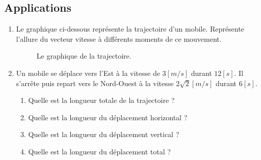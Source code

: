 \newpage

\subsection{Applications}
\begin{enumerate}
    \item Le graphique ci-dessous représente la trajectoire d'un mobile. Représente l'allure du vecteur vitesse à différents moments de ce mouvement.
          \begin{figure}[h!]
              \centering
              \resizebox{.8\linewidth}{!}{}
              \caption{Le graphique de la trajectoire.}
              \label{exercice_deplacement}
          \end{figure}
    \item Un mobile se déplace vers l'Est à la vitesse de \(\num{3} \unit{[m/s]}\) durant \(12 \unit{[s]}\). Il s'arrête puis repart vers le Nord-Ouest à la vitesse \(2 \sqrt{2} \unit{[m/s]}\) durant \(6\unit{[s]}\).
          \begin{enumerate}[label=\alph*)]
              \item Quelle est la longueur totale de la trajectoire ?
              \item Quelle est la longueur du déplacement horizontal ?
              \item Quelle est la longueur du déplacement vertical ?
              \item Quelle est la longueur du déplacement total ?
          \end{enumerate}
\end{enumerate}

